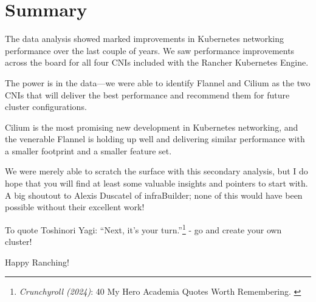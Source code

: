 %
%

\pagebreak
\section{Summary}

\onehalfspacing

The data analysis showed marked improvements in Kubernetes networking performance over the last couple of years. We saw performance improvements across the board for all four CNIs included with the Rancher Kubernetes Engine.

The power is in the data—we were able to identify Flannel and Cilium as the two CNIs that will deliver the best performance and recommend them for future cluster configurations.

Cilium is the most promising new development in Kubernetes networking, and the venerable Flannel is holding up well and delivering similar performance with a smaller footprint and a smaller feature set.

We were merely able to scratch the surface with this secondary analysis, but I do hope that you will find at least some valuable insights and pointers to start with. A big shoutout to Alexis Duscatel of infraBuilder; none of this would have been possible without their excellent work!

To quote Toshinori Yagi: “Next, it’s your turn.”\footnote{\textit{Crunchyroll (2024)}: 40 My Hero Academia Quotes Worth Remembering. \cite{mhaQuotes}} - go and create your own cluster!

Happy Ranching!
